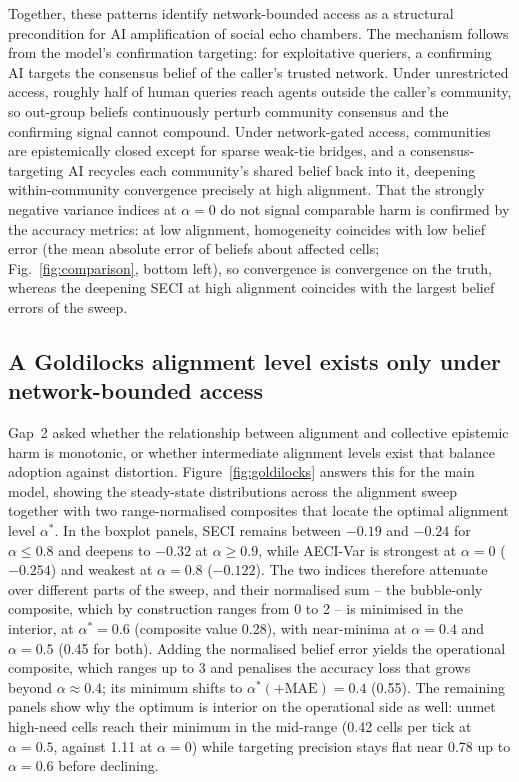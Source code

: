 \documentclass[pdflatex,sn-basic]{sn-jnl}
\begin{document}
Together, these patterns identify network-bounded access as a structural precondition for AI amplification of social echo chambers. The mechanism follows from the model's confirmation targeting: for exploitative queriers, a confirming AI targets the consensus belief of the caller's trusted network. Under unrestricted access, roughly half of human queries reach agents outside the caller's community, so out-group beliefs continuously perturb community consensus and the confirming signal cannot compound. Under network-gated access, communities are epistemically closed except for sparse weak-tie bridges, and a consensus-targeting AI recycles each community's shared belief back into it, deepening within-community convergence precisely at high alignment. That the strongly negative variance indices at $\alpha = 0$ do not signal comparable harm is confirmed by the accuracy metrics: at low alignment, homogeneity coincides with low belief error (the mean absolute error of beliefs about affected cells; Fig.~\ref{fig:comparison}, bottom left), so convergence is convergence on the truth, whereas the deepening SECI at high alignment coincides with the largest belief errors of the sweep.

\subsection{A Goldilocks alignment level exists only under network-bounded access}\label{sec:claim2}

Gap~2 asked whether the relationship between alignment and collective epistemic harm is monotonic, or whether intermediate alignment levels exist that balance adoption against distortion. Figure~\ref{fig:goldilocks} answers this for the main model, showing the steady-state distributions across the alignment sweep together with two range-normalised composites that locate the optimal alignment level $\alpha^{*}$. In the boxplot panels, SECI remains between $-0.19$ and $-0.24$ for $\alpha \leq 0.8$ and deepens to $-0.32$ at $\alpha \geq 0.9$, while AECI-Var is strongest at $\alpha = 0$ ($-0.254$) and weakest at $\alpha = 0.8$ ($-0.122$). The two indices therefore attenuate over different parts of the sweep, and their normalised sum -- the bubble-only composite, which by construction ranges from 0 to 2 -- is minimised in the interior, at $\alpha^{*} = 0.6$ (composite value 0.28), with near-minima at $\alpha = 0.4$ and $\alpha = 0.5$ (0.45 for both). Adding the normalised belief error yields the operational composite, which ranges up to 3 and penalises the accuracy loss that grows beyond $\alpha \approx 0.4$; its minimum shifts to $\alpha^{*}(+\text{MAE}) = 0.4$ (0.55). The remaining panels show why the optimum is interior on the operational side as well: unmet high-need cells reach their minimum in the mid-range (0.42 cells per tick at $\alpha = 0.5$, against 1.11 at $\alpha = 0$) while targeting precision stays flat near 0.78 up to $\alpha = 0.6$ before declining.
\end{document}
